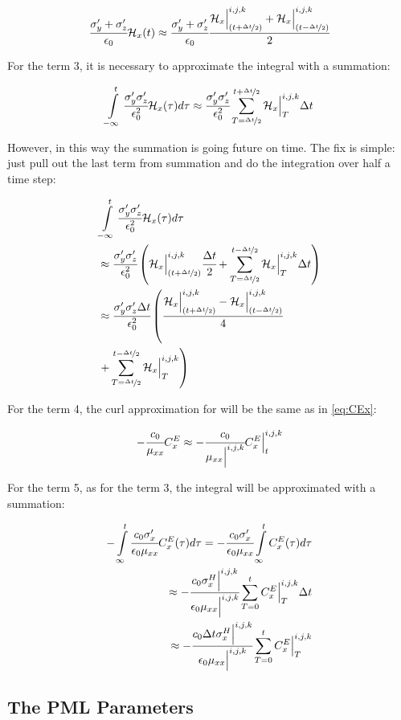 \begin{eqnarray}
    \cfrac{\sigma_y^{\prime} + \sigma_z^{\prime}}{\epsilon_0}\mathcal{H}_x(t)\approx
    \cfrac{\sigma_y^{\prime} + \sigma_z^{\prime}}{\epsilon_0}\cfrac{\mathcal{H}_x\Big|_{(t+\nicefrac{\Delta t}{2})}^{i,j,k}+\mathcal{H}_x\Big|^{i,j,k}_{(t-\nicefrac{\Delta t}{2})}}{2}
\end{eqnarray}

For the term 3, it is necessary to approximate the integral with a summation:

\begin{eqnarray}
    \int\limits_{-\infty}^t\cfrac{\sigma_y^{\prime}\sigma_z^{\prime}}{\epsilon_0^2}\mathcal{H}_x(\tau)d\tau \approx \cfrac{\sigma_y^{\prime}\sigma_z^{\prime}}{\epsilon_0^2} \sum_{T=\nicefrac{\Delta t}{2}}^{t + \nicefrac{\Delta t}{2}}\mathcal{H}_x\Big|^{i,j,k}_{T}\Delta t
\end{eqnarray}

However, in this way the summation is going future on time. The fix is simple: just pull out the last term from summation and do the integration over half a time step:

\begin{eqnarray}
    &\int\limits_{-\infty}^t\cfrac{\sigma_y^{\prime}\sigma_z^{\prime}}{\epsilon_0^2}\mathcal{H}_x(\tau)d\tau \nonumber \\ \nonumber
    &\approx \cfrac{\sigma_y^{\prime}\sigma_z^{\prime}}{\epsilon_0^2} \left( \mathcal{H}_x\Big|_{(t+\nicefrac{\Delta t}{2})}^{i,j,k} \cfrac{\Delta t}{2} + \sum\limits_{T=\nicefrac{\Delta t}{2}}^{t - \nicefrac{\Delta t}{2}}\mathcal{H}_x\Big|^{i,j,k}_{T}\Delta t \right) \\ \nonumber
    &\approx\cfrac{\sigma_y^{\prime}\sigma_z^{\prime}\Delta t}{\epsilon_0^2} \left( \cfrac{\mathcal{H}_x\Big|_{(t+\nicefrac{\Delta t}{2})}^{i,j,k}-\mathcal{H}_x\Big|^{i,j,k}_{(t-\nicefrac{\Delta t}{2})}}{4} \right. \\ & \left. + \sum\limits_{T=\nicefrac{\Delta t}{2}}^{t - \nicefrac{\Delta t}{2}}\mathcal{H}_x\Big|^{i,j,k}_{T} \right)
\end{eqnarray}

For the term 4, the curl approximation for will be the same as in \eqref{eq:CEx}:

\begin{eqnarray}
    -\cfrac{c_0}{\mu_{xx}}C_x^E \approx -\cfrac{c_0}{\mu_{xx}\Big|^{i,j,k}}C_x^E\Big|^{i,j,k}_{t}
\end{eqnarray}

For the term 5, as for the term 3, the integral will be approximated with a summation:

\begin{eqnarray}
    - \int\limits_{\infty}^t\cfrac{c_0\sigma_x^{\prime}}{\epsilon_0\mu_{xx}}C_x^E(\tau)d\tau = - \cfrac{c_0\sigma_x^{\prime}}{\epsilon_0\mu_{xx}} \int\limits_{\infty}^tC_x^E(\tau)d\tau \nonumber \\
    \approx - \cfrac{c_0\sigma_x^H\Big|^{i,j,k}}{\epsilon_0\mu_{xx}\Big|^{i,j,k}} \sum\limits_{T=0}^{t}C_x^E\Big|^{i,j,k}_{T}\Delta t \nonumber \\
    \approx - \cfrac{c_0\Delta t\sigma_x^H\Big|^{i,j,k}}{\epsilon_0\mu_{xx}\Big|^{i,j,k}} \sum\limits_{T=0}^{t}C_x^E\Big|^{i,j,k}_{T}
\end{eqnarray}

\subsection{The PML Parameters}



